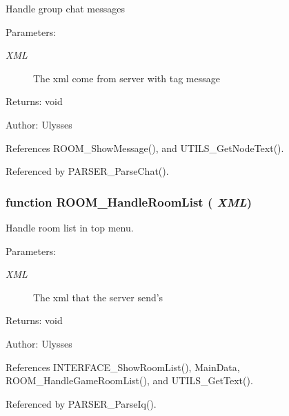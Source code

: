 Handle group chat messages

\begin{Desc}
\item[Parameters:]
\begin{description}
\item[{\em XML}]The xml come from server with tag message \end{description}
\end{Desc}
\begin{Desc}
\item[Returns:]void \end{Desc}
\begin{Desc}
\item[Author:]Ulysses \end{Desc}


References ROOM\_\-ShowMessage(), and UTILS\_\-GetNodeText().

Referenced by PARSER\_\-ParseChat().
\subsubsection{\setlength{\rightskip}{0pt plus 5cm}function ROOM\_\-HandleRoomList ( {\em XML})}\label{room_2room_8js_e60c68aa283c093e99208aa162fbadf4}


Handle room list in top menu.

\begin{Desc}
\item[Parameters:]
\begin{description}
\item[{\em XML}]The xml that the server send's \end{description}
\end{Desc}
\begin{Desc}
\item[Returns:]void \end{Desc}
\begin{Desc}
\item[Author:]Ulysses \end{Desc}


References INTERFACE\_\-ShowRoomList(), MainData, ROOM\_\-HandleGameRoomList(), and UTILS\_\-GetText().

Referenced by PARSER\_\-ParseIq().
